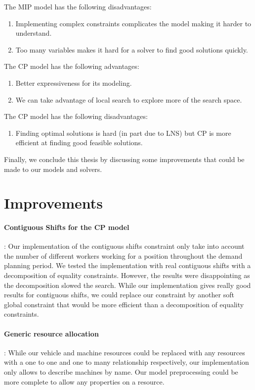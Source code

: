 \documentclass[../thesis.tex]{subfiles}
\begin{document}
The MIP model has the following disadvantages:
\begin{enumerate}[leftmargin=1.5cm,noitemsep]
  \item Implementing complex constraints complicates the model making it harder to understand.
  \item Too many variables makes it hard for a solver to find good solutions quickly.
\end{enumerate}


The CP model has the following advantages:
\begin{enumerate}[leftmargin=1.5cm,noitemsep]
  \item Better expressiveness for its modeling.
  \item We can take advantage of local search to explore more of the search space.
\end{enumerate}


The CP model has the following disadvantages:
\begin{enumerate}[leftmargin=1.5cm,noitemsep]
  \item Finding optimal solutions is hard (in part due to LNS) but CP is more efficient at 
        finding good feasible solutions.
\end{enumerate}



Finally, we conclude this thesis by discussing some improvements that could be made to our models and solvers.

\section{Improvements}

\paragraph{Contiguous Shifts for the CP model}: Our implementation of the contiguous shifts constraint only take into account 
the number of different workers working for a position throughout the demand planning period.
We tested the implementation with real contiguous shifts with a decomposition of equality constraints. However, the results 
were disappointing as the decomposition slowed the search. While our implementation gives really good results for contiguous shifts,
we could replace our constraint by another soft global constraint that would be more efficient than 
a decomposition of equality constraints.

\paragraph{Generic resource allocation}: While our vehicle and machine resources could be replaced with 
any resources with a one to one and one to many relationship respectively, our implementation only allows to describe
machines by name. Our model preprocessing could be more complete to allow any properties on a resource.
\end{document}
